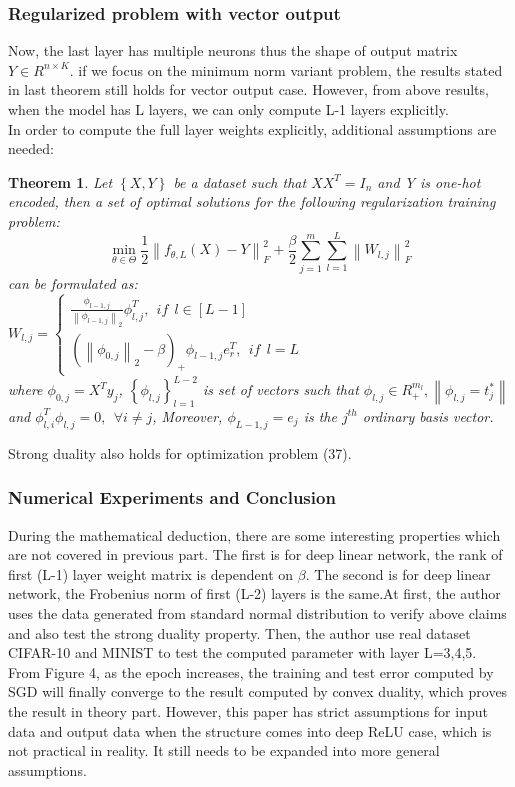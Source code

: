 \documentclass{article}
\newtheorem{theorem}{Theorem}
\begin{document}
\subsubsection{Regularized problem with vector output}
Now, the last layer has multiple neurons thus the shape of output matrix $Y\in R^{n\times K}$. if we focus on the minimum norm variant problem, the results stated in last theorem still holds for vector output case. However, from above results, when the model has L layers, we can only compute L-1 layers explicitly. \\
In order to compute the full layer weights explicitly, additional assumptions are needed:
\begin{theorem}
    Let $\left \{X,Y \right \}$ be a dataset such that $XX^T=I_n$ and Y is one-hot encoded, then a set of optimal solutions for the following regularization training problem:
    \begin{equation}
        \min_{\theta \in \Theta}\frac{1}{2}\left \| f_{\theta,L}(X)-Y \right \|_F^2+\frac{\beta}{2}\sum_{j=1}^{m}\sum_{l=1}^{L}\left \| W_{l,j} \right \|_F^2
    \end{equation}
    can be formulated as:\\
    $W_{l,j}=\begin{cases}
    \frac{\phi_{l-1,j}}{\left \| \phi_{l-1,j} \right \|_2} \phi^T_{l,j} , \ \ if \ \ l\in [L-1]\\
    \left ( \left \| \phi_{0,j} \right \|_2-\beta \right )_+ \phi_{l-1,j}e^T_r, \ \ if \ \ l=L
    \end{cases}$ \\
    where $\phi_{0,j}=X^Ty_j$, $\left \{ \phi_{l,j} \right \}_{l=1}^{L-2}$ is set of vectors such that $\phi_{l,j} \in R^{m_l}_+, \left \| \phi_{l,j}=t_j^* \right \| $ and $\phi_{l,i}^T\phi_{l,j}=0, \ \ \forall i \neq j$, Moreover, $\phi_{L-1,j}=e_j$ is the $j^{th}$ ordinary basis vector. 
\end{theorem}
Strong duality also holds for optimization problem (37).
\subsubsection{Numerical Experiments and Conclusion}
During the mathematical deduction, there are some interesting properties which are not covered in previous part. The first is for deep linear network, the rank of first (L-1) layer weight matrix is dependent on $\beta$. The second is for deep linear network, the Frobenius norm of first (L-2) layers is the same.At first, the author uses the data generated from standard normal distribution to verify above claims and also test the strong duality property. Then, the author use real dataset CIFAR-10 \cite{CIFAR} and MINIST to test the computed parameter with layer L=3,4,5. From Figure 4\cite{cvxduality1}, as the epoch increases, the training and test error computed by SGD will finally converge to the result computed by convex duality, which proves the result in theory part. However, this paper has strict assumptions for input data and output data when the structure comes into deep ReLU case, which is not practical in reality. It still needs to be expanded into more general assumptions.
\end{document}
